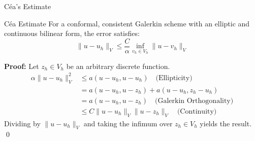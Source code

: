 \documentclass[aspectratio=169]{beamer}
\begin{document}
\begin{frame}{C\'ea's Estimate}
    \begin{block}{Céa Estimate}
        For a conformal, consistent Galerkin scheme with an elliptic and continuous bilinear form, the error satisfies:
    $$ \|u - u_h\|_V \le \frac{C}{\alpha} \inf_{v_h \in V_h} \|u - v_h\|_V $$
    \end{block}

    \textbf{Proof:} Let $z_h \in V_h$ be an arbitrary discrete function.
    \begin{align*}
        \alpha \|u - u_h\|_V^2 &\le a(u - u_h, u - u_h) \quad \text{(Ellipticity)} \\
        &= a(u - u_h, u - z_h) + a(u - u_h, z_h - u_h) \\
        &= a(u - u_h, u - z_h) \quad \text{(Galerkin Orthogonality)} \\
        &\le C \|u - u_h\|_V \|u - z_h\|_V \quad \text{(Continuity)}
    \end{align*}
    Dividing by $\|u - u_h\|_V$ and taking the infimum over $z_h \in V_h$ yields the result. \qed
\end{frame}


\begin{frame}
    \titlepage
\end{frame}
\end{document}
